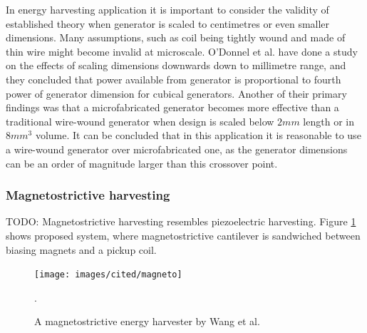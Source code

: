 In energy harvesting application it is important to consider the validity of established theory when generator is scaled to centimetres or even smaller dimensions. Many assumptions, such as coil being tightly wound and made of thin wire might become invalid at microscale. O'Donnel et al. \cite{ODonnell2007} have done a study on the effects of scaling dimensions downwards down to millimetre range, and they concluded that power available from generator is proportional to fourth power of generator dimension for cubical generators. Another of their primary findings was that a microfabricated generator becomes more effective than a traditional wire-wound generator when design is scaled below $2 mm$ length or in $8 mm^3$ volume. It can be concluded that in this application it is reasonable to use a wire-wound generator over microfabricated one, as the generator dimensions can be an order of magnitude larger than this crossover point. 

\subsubsection{Magnetostrictive harvesting}
TODO: Magnetostrictive harvesting resembles piezoelectric harvesting. Figure \ref{magneto} shows proposed system, where magnetostrictive cantilever is sandwiched between biasing magnets and a pickup coil.  

\begin{figure}[htb]
\begin{center}
\texttt{[image: images/cited/magneto]}
\end{center}
\caption{A magnetostrictive energy harvester by Wang et al. \cite{Wang2006}}.
\label{magneto}
\end{figure}

